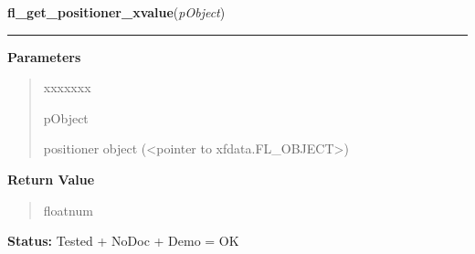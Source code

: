 \hspace{.8\funcindent}\begin{boxedminipage}{\funcwidth}

    \raggedright \textbf{fl\_get\_positioner\_xvalue}(\textit{pObject})

    \vspace{-1.5ex}

    \rule{\textwidth}{0.5\fboxrule}
\setlength{\parskip}{2ex}
\setlength{\parskip}{1ex}
      \textbf{Parameters}
      \vspace{-1ex}

      \begin{quote}
        \begin{Ventry}{xxxxxxx}

          \item[pObject]

          positioner object ({\textless}pointer to 
          xfdata.FL\_OBJECT{\textgreater})

        \end{Ventry}

      \end{quote}

      \textbf{Return Value}
    \vspace{-1ex}

      \begin{quote}
      floatnum

      \end{quote}

\textbf{Status:} Tested + NoDoc + Demo = OK



    \end{boxedminipage}

    \label{xformslib:library:fl_set_positioner_xbounds}

    \vspace{0.5ex}

